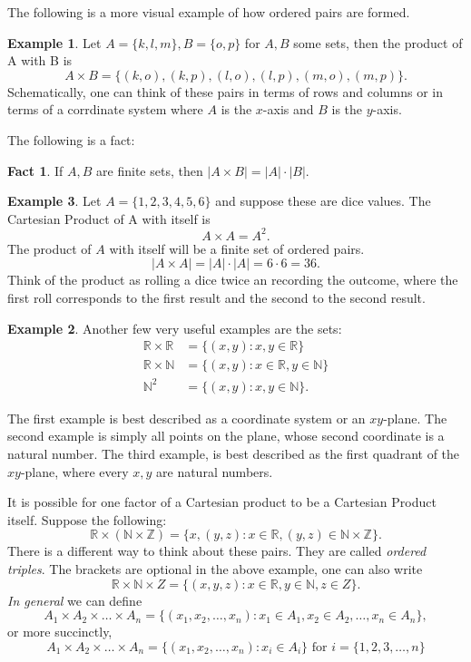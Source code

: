 \documentclass{article}
\theoremstyle{definition}
\newtheorem{example}{Example}[subsection]
\newtheorem{fact}{Fact}[subsection]
\newcommand{\R}{\mathbb{R}}
\newcommand{\N}{\mathbb{N}}
\newcommand{\Z}{\mathbb{Z}}
\begin{document}
The following is a more visual example of how ordered pairs are formed.
\begin{example}
    Let $A=\{k,l,m\}, B=\{o,p\}$ for $A,B$ some sets, then the product of A with B is 
    $$
    A\times B = \{(k,o),(k,p),(l,o),(l,p),(m,o),(m,p)\}.
    $$
    Schematically, one can think of these pairs in terms of rows and columns or in terms of a corrdinate system where $A$ is the $x$-axis and $B$ is the $y$-axis. 
\end{example}
The following is a fact: 
\begin{fact}
    If $A,B$ are finite sets, then $\lvert A\times B \rvert = \lvert A \rvert\cdot \lvert B \rvert.$
\end{fact}

\begin{example}
    Let $A=\{1,2,3,4,5,6\}$ and suppose these are dice values. The Cartesian Product of A with itself is 
    $$
    A\times A = A^{2}.
    $$
The product of $A$ with itself will be a finite set of ordered pairs. 
$$
\lvert A\times A \rvert = \lvert A \rvert \cdot \lvert A \rvert= 6\cdot 6 = 36.
$$
Think of the product as rolling a dice twice an recording the outcome, where the first roll corresponds to the first result and the second to the second result. 

\begin{example}
Another few very useful examples are the sets: 
$$
\begin{aligned}
\R \times \R &= \{(x,y): x,y \in \R\}\\
\R \times \N &= \{(x,y): x\in \R, y\in \N\}\\
\N^{2} &= \{(x,y): x,y\in \N\}. 
\end{aligned}
$$
\end{example}
The first example is best described as a coordinate system or an $xy$-plane. The second example is simply all points on the plane, whose second coordinate is a natural number. The third example, is best described as the first quadrant of the $xy$-plane, where every $x,y$ are natural numbers.  
\end{example}

It is possible for one factor of a Cartesian product to be a Cartesian Product itself. Suppose the following: 
$$
\R \times (\N \times \Z) =\{x, (y,z): x\in \R, (y,z)\in \N\times \Z\}.
$$
There is a different way to think about these pairs. They are called \emph{ordered triples}. 
The brackets are optional in the above example, one can also write 
$$
\R \times \N \times Z = \{(x,y,z): x\in \R, y\in \N, z\in Z\}.
$$
\emph{In general} we can define 
$$
A_{1}\times A_2\times \dots \times A_n =\{(x_1,x_2,\dots,x_n): x_1\in A_1,x_2\in A_2,\dots,x_n\in A_n\},
$$
or more succinctly, 
$$
A_{1}\times A_2 \times \dots \times A_n =\{(x_1,x_2,\dots,x_n): x_i\in A_i\} \text{ for } i=\{1,2,3,\dots,n\}
$$
\end{document}
